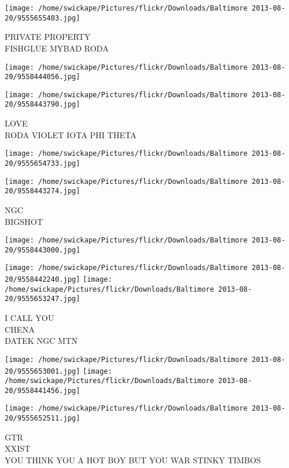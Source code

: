 \documentclass[10pt,letterpaper]{article}
\begin{document}
\vspace{0.25in}
\texttt{[image: /home/swickape/Pictures/flickr/Downloads/Baltimore 2013-08-20/9555655403.jpg]}

PRIVATE PROPERTY\\
FISHGLUE MYBAD RODA\\
\pagebreak

\texttt{[image: /home/swickape/Pictures/flickr/Downloads/Baltimore 2013-08-20/9558444056.jpg]}

\vspace{0.25in}
\texttt{[image: /home/swickape/Pictures/flickr/Downloads/Baltimore 2013-08-20/9558443790.jpg]}

LOVE\\
RODA VIOLET IOTA PHI THETA\\
\pagebreak

\texttt{[image: /home/swickape/Pictures/flickr/Downloads/Baltimore 2013-08-20/9555654733.jpg]}

\vspace{0.25in}
\texttt{[image: /home/swickape/Pictures/flickr/Downloads/Baltimore 2013-08-20/9558443274.jpg]}

NGC\\
BIGSHOT\\
\pagebreak

\texttt{[image: /home/swickape/Pictures/flickr/Downloads/Baltimore 2013-08-20/9558443000.jpg]}

\vspace{0.25in}
\texttt{[image: /home/swickape/Pictures/flickr/Downloads/Baltimore 2013-08-20/9558442240.jpg]}
\texttt{[image: /home/swickape/Pictures/flickr/Downloads/Baltimore 2013-08-20/9555653247.jpg]}

I CALL YOU\\
CHENA\\
DATEK NGC MTN\\
\pagebreak

\texttt{[image: /home/swickape/Pictures/flickr/Downloads/Baltimore 2013-08-20/9555653001.jpg]}
\texttt{[image: /home/swickape/Pictures/flickr/Downloads/Baltimore 2013-08-20/9558441456.jpg]}

\texttt{[image: /home/swickape/Pictures/flickr/Downloads/Baltimore 2013-08-20/9555652511.jpg]}

GTR\\
XXIST\\
YOU THINK YOU A HOT BOY BUT YOU WAR STINKY TIMBOS\\
\pagebreak
\end{document}
